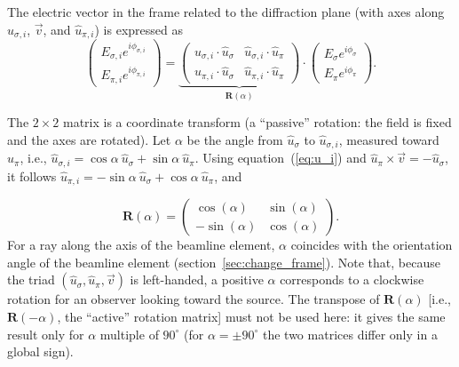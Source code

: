 \documentclass{iucr}
\begin{document}
The electric vector in the frame related to the diffraction plane (with axes along $\hat{u}_{\sigma,i}$, $\vec{v}$, and $\hat{u}_{\pi,i}$) is expressed as 
\begin{equation}
  \left( \begin{array}{c}
    E_{\sigma,i} e^{i \phi_{\sigma,i}} \\
    E_{\pi,i} e^{i \phi_{\pi,i}}
  \end{array} \right)
  =
  \underbrace{
  \left( \begin{array}{cc}
    \hat{u}_{\sigma,i} \cdot \hat{u}_{\sigma} &
    \hat{u}_{\sigma,i} \cdot \hat{u}_{\pi} \\
    \hat{u}_{\pi,i} \cdot \hat{u}_{\sigma} &
    \hat{u}_{\pi,i} \cdot \hat{u}_{\pi} 
  \end{array} \right)
  }_{\textbf{R}(\alpha)}
  \cdot
  \left( \begin{array}{c}
    E_{\sigma} e^{i \phi_{\sigma}} \\
    E_{\pi} e^{i \phi_{\pi}}
  \end{array} \right).
\end{equation}

The $2\times 2$ matrix is a coordinate transform (a ``passive'' rotation: the field is fixed and the axes are rotated). Let $\alpha$ be the angle from $\hat{u}_\sigma$ to $\hat{u}_{\sigma,i}$, measured toward $\hat{u}_\pi$, i.e., $\hat{u}_{\sigma,i}=\cos\alpha~\hat{u}_\sigma + \sin\alpha~\hat{u}_\pi$. Using equation~(\ref{eq:u_i}) and $\hat{u}_\pi \times \vec{v} = -\hat{u}_\sigma$, it follows $\hat{u}_{\pi,i}=-\sin\alpha~\hat{u}_\sigma + \cos\alpha~\hat{u}_\pi$, and

\begin{equation}\label{eq:rotation}
  \textbf{R}(\alpha)
  =
  \left( \begin{array}{cc}
    \cos(\alpha) & \sin(\alpha) \\
    -\sin(\alpha) & \cos(\alpha)
 \end{array} \right).
\end{equation}
For a ray along the axis of the beamline element, $\alpha$ coincides with the orientation angle of the beamline element (section~\ref{sec:change_frame}).
Note that, because the triad $(\hat{u}_\sigma, \hat{u}_\pi, \vec{v})$ is left-handed, a positive $\alpha$ corresponds to a clockwise rotation for an observer looking toward the source.
The transpose of $\textbf{R}(\alpha)$ [i.e., $\textbf{R}(-\alpha)$, the ``active'' rotation matrix] must not be used here: it gives the same result only for $\alpha$ multiple of $90^\circ$ (for $\alpha=\pm 90^\circ$ the two matrices differ only in a global sign).
\end{document}
